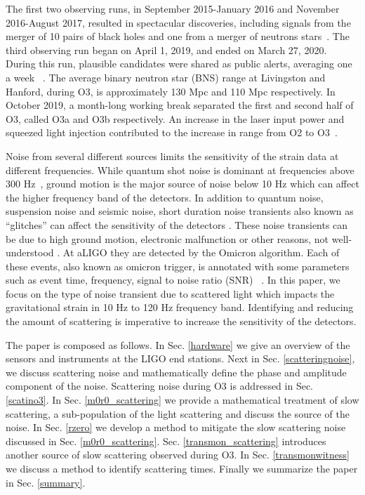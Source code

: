 \documentclass[12pt]{iopart}
\begin{document}
The first two observing runs, in September 2015-January 2016 and November 2016-August 2017, resulted in spectacular discoveries, including signals from the merger of 10 pairs of black holes and one from a merger of neutrons stars~\cite{Abbott_2019,Abbott_2016,neturonpaper}. The third observing run began on April 1, 2019, and ended on March 27, 2020. During this run, plausible candidates were shared as public alerts, averaging one a week ~\cite{gracedb}. The average binary neutron star (BNS) range at Livingston and Hanford, during O3, is approximately 130 Mpc and 110 Mpc respectively. In October 2019, a month-long working break separated the first and second half of O3, called O3a and O3b respectively. An increase in the laser input power and squeezed light injection contributed to the increase in range from O2 to O3~\cite{prospect}.


Noise from several different sources limits the sensitivity of the strain data at different frequencies. 
While quantum shot noise is dominant at frequencies above 300 Hz~\cite{tjthesis}, ground motion is the major source of noise below 10 Hz which can affect the higher frequency band of the detectors. In addition to quantum noise, suspension noise and seismic noise, short duration noise transients also known as ``glitches'' can affect the sensitivity of the detectors \cite{transientpaper}. These noise transients can be due to high ground motion, electronic malfunction or other reasons, not well-understood \cite{Nuttall_2018,noisepaper,Cabero_2019}. At aLIGO they are detected by the Omicron algorithm. Each of these events, also known as omicron trigger, is annotated with some parameters such as event time, frequency, signal to noise ratio (SNR) ~\cite{omicron_florent,McIver:2015pms}. In this paper, we focus on the type of noise transient due to scattered light which impacts the gravitational strain in 10 Hz to 120 Hz frequency band. Identifying and reducing the amount of scattering is imperative to increase the sensitivity of the detectors. 
 
The paper is composed as follows. In Sec. \ref{hardware} we give an overview of the sensors and instruments at the LIGO end stations. Next in Sec. \ref{scatteringnoise}, we discuss scattering noise and mathematically define the phase and amplitude component of the noise. Scattering noise during O3 is addressed in Sec. \ref{scatino3}. In Sec. \ref{m0r0_scattering} we provide a mathematical treatment of slow scattering, a sub-population of the light scattering and discuss the source of the noise. In Sec. \ref{rzero} we develop a method to mitigate the slow scattering noise discussed in Sec. \ref{m0r0_scattering}. Sec. \ref{transmon_scattering} introduces another source of slow scattering observed during O3. In Sec. \ref{transmonwitness} we discuss a method to identify scattering times. Finally we summarize the paper in Sec. \ref{summary}. 
\end{document}
